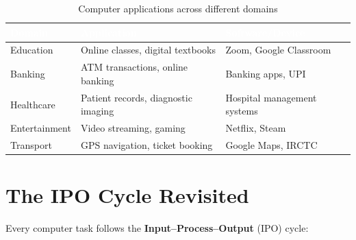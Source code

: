 \begin{table}[H]
\centering
\caption{Computer applications across different domains}
\label{tab:real-life-apps}
\renewcommand{\arraystretch}{1.3}
\begin{tabularx}{\textwidth}{l X X}
\toprule
\rowcolor{HeaderRow}
\textcolor{white}{\textbf{Domain}} & \textcolor{white}{\textbf{Application}} & \textcolor{white}{\textbf{Software/Device}} \\
\midrule
\rowcolor{RowLight} Education & Online classes, digital textbooks & Zoom, Google Classroom \\
\rowcolor{RowDark} Banking & ATM transactions, online banking & Banking apps, UPI \\
\rowcolor{RowLight} Healthcare & Patient records, diagnostic imaging & Hospital management systems \\
\rowcolor{RowDark} Entertainment & Video streaming, gaming & Netflix, Steam \\
\rowcolor{RowLight} Transport & GPS navigation, ticket booking & Google Maps, IRCTC \\
\bottomrule
\end{tabularx}
\end{table}

\section{The IPO Cycle Revisited}
\label{sec:ipo-advanced}

Every computer task follows the \textbf{Input--Process--Output} (IPO) cycle:

\begin{center}
\end{center}

